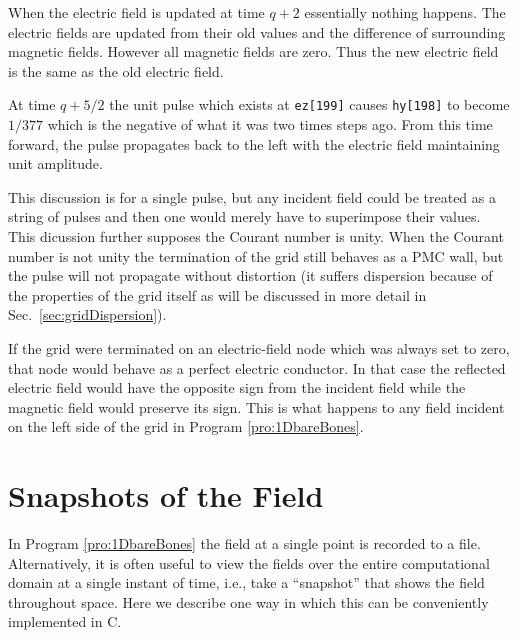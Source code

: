 When the electric field is updated at time $q+2$ essentially nothing
happens.  The electric fields are updated from their old values and
the difference of surrounding magnetic fields.  However all magnetic
fields are zero.  Thus the new electric field is the same as the old
electric field.

At time $q+5/2$ the unit pulse which exists at {\tt ez[199]} causes
{\tt hy[198]} to become $1/377$ which is the negative of what it was two
times steps ago.  From this time forward, the pulse propagates back to
the left with the electric field maintaining unit amplitude.

This discussion is for a single pulse, but any incident field could be
treated as a string of pulses and then one would merely have to
superimpose their values.  This dicussion further supposes the Courant
number is unity.  When the Courant number is not unity the termination
of the grid still behaves as a PMC wall, but the pulse will not
propagate without distortion (it suffers dispersion because of the
properties of the grid itself as will be discussed in more detail in
Sec.\ \ref{sec:gridDispersion}).

If the grid were terminated on an electric-field node which was
always set to zero, that node would behave as a perfect electric
conductor.  In that case the reflected electric field would have the
opposite sign from the incident field while the magnetic field would
preserve its sign.  This is what happens to any field incident on the
left side of the grid in Program \ref{pro:1DbareBones}.

\section{Snapshots of the Field}

In Program \ref{pro:1DbareBones} the field at a single point is
recorded to a file.  Alternatively, it is often useful to view the
fields over the entire computational domain at a single instant of
time, i.e., take a ``snapshot'' that shows the field throughout space.
Here we describe one way in which this can be conveniently implemented
in C.

